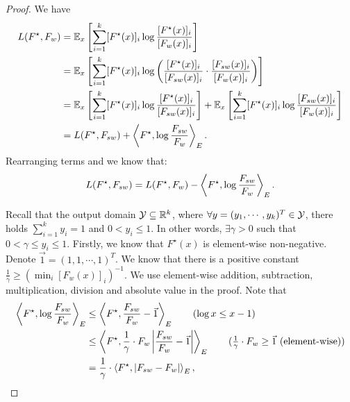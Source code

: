 \begin{proof}
We have
\begin{align}
    L(F^\star, F_w) &= \mathbb{E}_x \left[ \sum_{i=1}^k [F^\star(x)]_i \log \frac{[F^\star(x)]_i}{[F_w(x)]_i} \right] \nonumber \\
    &= \mathbb{E}_x \left[ \sum_{i=1}^k [F^\star(x)]_i \log \left( \frac{[F^\star(x)]_i}{[F_{sw}(x)]_i} \cdot \frac{[F_{sw}(x)]_i}{[F_w(x)]_i} \right) \right] \nonumber \\
    &= \mathbb{E}_x \left[ \sum_{i=1}^k [F^\star(x)]_i \log  \frac{[F^\star(x)]_i}{[F_{sw}(x)]_i} \right] + \mathbb{E}_x \left[ \sum_{i=1}^k [F^\star(x)]_i \log  \frac{[F_{sw}(x)]_i}{[F_w(x)]_i} \right] \nonumber \\
    & = L(F^\star, F_{sw}) + \left \langle F^\star, \log{\frac{F_{sw}}{F_w}} \right \rangle_E.
\end{align}
Rearranging terms and we know that:
\begin{align} \label{eqn:temp_b3}
    L(F^\star, F_{sw}) = L(F^\star, F_w) - \left \langle F^\star, \log{\frac{F_{sw}}{F_w}} \right \rangle_E.
\end{align}


Recall that the output domain $\mathcal{Y} \subseteq \mathbb{R}^k$, where $\forall y = (y_1, \cdots, y_k)^T \in \mathcal{Y}$, there holds $\sum_{i=1}^k y_i=1$ and $0 < y_i \le 1$.
In other words, $\exists \gamma>0$ such that $0 < \gamma \le y_i \le 1$.
Firstly, we know that $F^\star(x)$ is element-wise non-negative.
Denote $\vec{1}=(1,1, \cdots, 1)^T$. We know that there is a positive constant $\frac{1}{\gamma} \ge \left(\min_i [F_w(x)]_i \right)^{-1}$.
We use element-wise addition, subtraction, multiplication, division and absolute value in the proof.
Note that 
\begin{align*}
    \left \langle F^\star, \log{\frac{F_{sw}}{F_w}} \right \rangle_E & \le \left \langle F^\star, \frac{F_{sw}}{F_w} -\vec{1} \right \rangle_E \tag{$\log x \le x-1$} \\
    & \le \left \langle F^\star, \frac{1}{\gamma} \cdot F_w \left\vert \frac{F_{sw}}{F_w} -\vec{1} \right\vert \right \rangle_E \tag{$\frac{1}{\gamma} \cdot F_w \ge \vec{1}$ (element-wise)} \\
    & = \frac{1}{\gamma} \cdot \left \langle F^\star, \left\vert F_{sw}-F_w \right\vert  \right \rangle_E,
\end{align*}


\end{proof}
